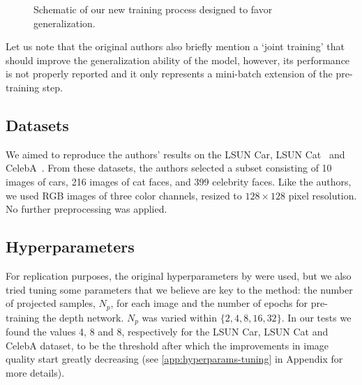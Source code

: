 \begin{figure}[!htb]
{}
    \caption{Schematic of our new training process designed to favor generalization.}
    \label{fig:trainerFlowchart}
\end{figure}
Let us note that the original authors also briefly mention a `joint training' that should improve the generalization ability of the model, however, its performance is not properly reported and it only represents a mini-batch extension of the pre-training step.
\subsection{Datasets}
We aimed to reproduce the authors' results on the LSUN Car, LSUN Cat~\cite{yu2015lsun} and CelebA~\cite{celeba}. From these datasets, the authors selected a subset consisting of 10 images of cars, 216 images of cat faces, and 399 celebrity faces. Like the authors, we used RGB images of three color channels, resized to $128 \times 128$ pixel resolution. No further preprocessing was applied.
\subsection{Hyperparameters}
\label{sec:hyperparams}
For replication purposes, the original hyperparameters by \textcite{gan2shape} were used, but we also tried tuning some parameters that we believe are key to the method: the number of projected samples, $N_p$, for each image and the number of epochs for pre-training the depth network. $N_p$ was varied within $\{2, 4, 8, 16, 32\}$. In our tests we found the values 4, 8 and 8, respectively for the LSUN Car, LSUN Cat and CelebA dataset, to be the threshold after which the improvements in image quality start greatly decreasing (see \autoref{app:hyperparams-tuning} in Appendix for more details).

